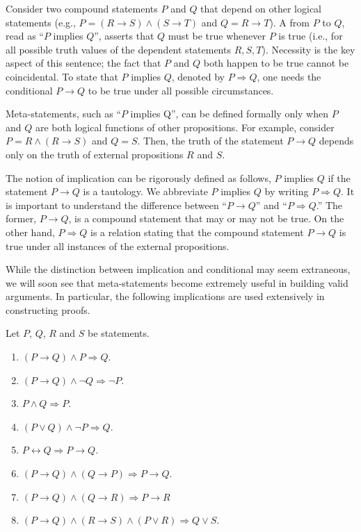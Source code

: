 Consider two compound statements $P$ and $Q$ that depend on other logical statements (e.g., $P = (R \to S) \wedge (S \to T)$ and $Q = R \to T$).
A  from $P$ to $Q$, read as ``$P$ implies $Q$'',  asserts that $Q$ must be true whenever $P$ is true (i.e., for all possible truth values of the dependent statements $R,S,T$).
Necessity is the key aspect of this sentence; the fact that $P$ and $Q$ both happen to be true cannot be coincidental.
To state that $P$ implies $Q$, denoted by $P \Rightarrow Q$, one needs the conditional $P \rightarrow Q$ to be true under all possible circumstances.

Meta-statements, such as ``$P$ implies Q'', can be defined formally only when $P$ and $Q$ are both logical functions of other propositions.
For example, consider $P=R \wedge (R \to S)$ and $Q=S$.
Then, the truth of the statement $P \to Q$ depends only on the truth of external propositions $R$ and $S$.

The notion of implication can be rigorously defined as follows, $P$ implies $Q$ if the statement $P \rightarrow Q$ is a tautology.
We abbreviate $P$ implies $Q$ by writing $P \Rightarrow Q$.
It is important to understand the difference between ``$P \rightarrow Q$'' and ``$P \Rightarrow Q$.''
The former, $P \rightarrow Q$, is a compound statement that may or may not be true.
On the other hand, $P \Rightarrow Q$ is a relation stating that the compound statement $P \rightarrow Q$ is true under all instances of the external propositions.

While the distinction between implication and conditional may seem extraneous, we will soon see that meta-statements become extremely useful in building valid arguments.
In particular, the following implications are used extensively in constructing proofs.
\begin{fact}
Let $P$, $Q$, $R$ and $S$ be statements.
\begin{enumerate}
\item $(P \rightarrow Q) \wedge P \Rightarrow Q$.
\item $(P \rightarrow Q) \wedge \neg Q \Rightarrow \neg P$.
\item $P \wedge Q \Rightarrow P$.
\item $(P \vee Q) \wedge \neg P \Rightarrow Q$.
\item $P \leftrightarrow Q \Rightarrow P \rightarrow Q$.
\item $(P \rightarrow Q) \wedge (Q \rightarrow P) \Rightarrow P \rightarrow Q$.
\item $(P \rightarrow Q) \wedge (Q \rightarrow R) \Rightarrow P \rightarrow R$
\item $(P \rightarrow Q) \wedge (R \rightarrow S) \wedge (P \vee R) \Rightarrow Q \vee S$.
\end{enumerate}
\end{fact}

